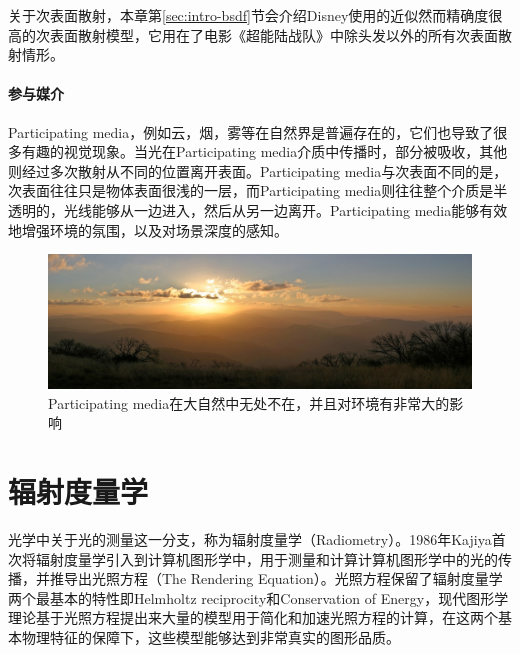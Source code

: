 关于次表面散射，本章第\ref{sec:intro-bsdf}节会介绍Disney使用的近似然而精确度很高的次表面散射模型，它用在了电影《超能陆战队》中除头发以外的所有次表面散射情形。






\paragraph{参与媒介}

Participating media，例如云，烟，雾等在自然界是普遍存在的，它们也导致了很多有趣的视觉现象。当光在Participating media介质中传播时，部分被吸收，其他则经过多次散射从不同的位置离开表面。Participating media与次表面不同的是，次表面往往只是物体表面很浅的一层，而Participating media则往往整个介质是半透明的，光线能够从一边进入，然后从另一边离开。Participating media能够有效地增强环境的氛围，以及对场景深度的感知。

\begin{figure}
	\includegraphics[width=1.0\textwidth]{figures/intro/Participating-media}
	\caption{Participating media在大自然中无处不在，并且对环境有非常大的影响}
	\label{f:intro-Participating-media}
\end{figure}









\section{辐射度量学}
光学中关于光的测量这一分支，称为辐射度量学（Radiometry）。1986年Kajiya\cite{a:TheRenderingEquation}首次将辐射度量学引入到计算机图形学中，用于测量和计算计算机图形学中的光的传播，并推导出光照方程（The Rendering Equation）。光照方程保留了辐射度量学两个最基本的特性即Helmholtz reciprocity和Conservation of Energy，现代图形学理论基于光照方程提出来大量的模型用于简化和加速光照方程的计算，在这两个基本物理特征的保障下，这些模型能够达到非常真实的图形品质。

